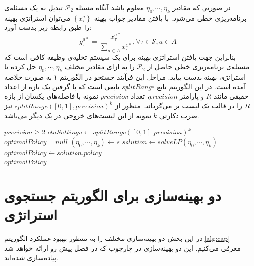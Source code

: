 در صورتی که مقادیر
$\eta_0, \cdots, \eta_k$
معلوم باشد آنگاه مسئله
$\mathcal{P}_2$
تبدیل به یک مسئله‌ی برنامه‌ریزی خطی می‌شود. با یافتن مقادیر جواب بهینه
$\left\{x_{\tau}^{a}\right\}$ 
می‌توان استراتژی بهینه را طبق رابطه زیر بدست آورد:
\begin{equation}
	g_{\tau}^{a *}=\frac{x_{\tau}^{a *}}{\sum_{a \in A} x_{\tau}^{a *}}, \forall \tau \in \mathcal{S}, a \in A
\end{equation}
بنابراین جهت یافتن استراتژی بهینه برای یک سیستم تخلیه‌ی وظیفه کافی است که مسئله‌ی برنامه‌ریزی خطی حاصل از
$\mathcal{P}_2$
را به ازای مقادیر مختلف 
$\eta_0, \cdots, \eta_k$
حل کرده تا استراتژی بهینه بدست بیاید. مراحل این فرآیند جستجو در الگوریتم ۱ به صورت خلاصه آمده است. در این الگوریتم تابع $splitRange$ تابعی است که با گرفتن یک بازه از اعداد حقیقی مانند $R$ و پارامتر $precision$، تعداد $precision$ نمونه با فاصله‌های یکسان از بازه $R$ را در قالب یک لیست بر می‌گرداند. منظور از $splitRange([0, 1], precision)^k$ نیز ضرب دکارتی $k$ نمونه از این لیست‌های خروجی در یک دیگر می‌باشد.

\begin{latin}
	\begin{algorithm}
		\begin{algorithmic}[1]
			\Require $precision \geq 2$
			\State $etaSettings \gets splitRange([0, 1], precision)^k$
			\State $optimalPolicy = null$
				\State $(\eta_0, \cdots, \eta_k) \gets s$
				\State $solution \gets solveLP(\eta_0, \cdots, \eta_k)$
					\State $optimalPolicy \gets solution.policy$
				\EndIf
			\EndFor \\
			\Return $optimalPolicy$
		\end{algorithmic}
	\end{algorithm}
\end{latin}
\newpage
\section{دو بهینه‌سازی برای الگوریتم جستجوی استراتژی}
\label{sec:optim}
در این بخش دو بهینه‌سازی مختلف را به منظور بهبود عملکرد الگوریتم \ref{alg:cap} معرفی می‌کنیم. این دو بهینه‌سازی در چارچوب  که در فصل پیش رو ارائه خواهد شد پیاده‌سازی شده‌اند.
